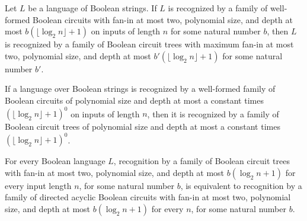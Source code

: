 \begin{theorem}
\label{Language.InNC.inTreeNC_one}
\leanok
{}
Let $L$ be a language of Boolean strings. If $L$ is recognized by a family of
well-formed Boolean circuits with fan-in at most two, polynomial size, and depth at most
$b(\lfloor\log_2 n\rfloor+1)$ on inputs of length $n$ for some natural number $b$, then
$L$ is recognized by a family of Boolean circuit trees with maximum fan-in at most two,
polynomial size, and depth at most $b'(\lfloor\log_2 n\rfloor+1)$ for some natural
number $b'$.
\end{theorem}

\begin{theorem}
\label{Language.InAC.inTreeAC_zero}
\leanok
{}
If a language over Boolean strings is recognized by a well-formed family of Boolean
circuits of polynomial size and depth at most a constant times $(\lfloor\log_2
n\rfloor+1)^0$ on inputs of length $n$, then it is recognized by a family of Boolean
circuit trees of polynomial size and depth at most a constant times $(\lfloor\log_2
n\rfloor+1)^0$.
\end{theorem}

\begin{theorem}
\label{Language.inNC_one_iff}
\leanok
{}
For every Boolean language $L$, recognition by a family of Boolean circuit trees with
fan-in at most two, polynomial size, and depth at most $b(\log_2 n+1)$ for every input
length $n$, for some natural number $b$, is equivalent to recognition by a family of
directed acyclic Boolean circuits with fan-in at most two, polynomial size, and depth at
most $b(\log_2 n+1)$ for every $n$, for some natural number $b$.
\end{theorem}

